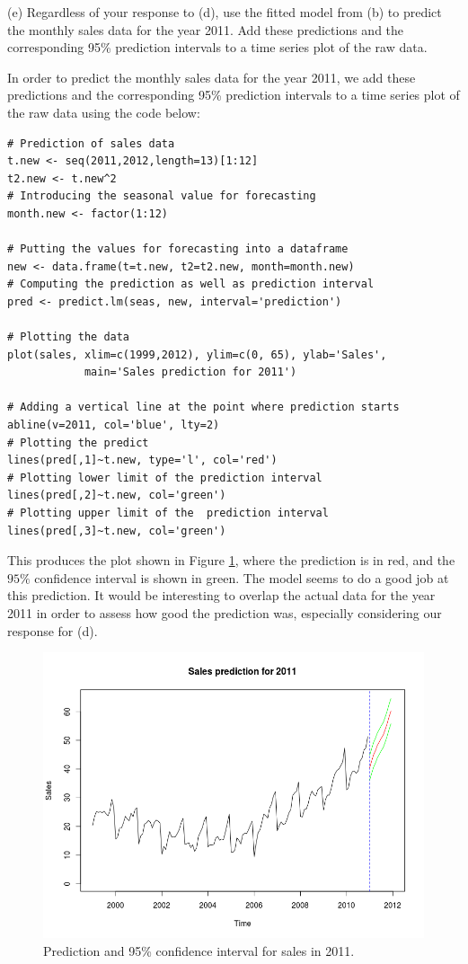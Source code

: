 \documentclass[]{article}
\begin{document}
(e) Regardless of your response to (d), use the fitted model from (b) to predict the monthly sales data for the year 2011. Add these predictions and the corresponding 95\% prediction intervals to a time series plot of the raw data.

\color{blue}
In order to predict the monthly sales data for the year 2011, we add these predictions and the corresponding 95\% prediction intervals to a time series plot of the raw data using the code below:

\begin{Verbatim}[frame=single]
# Prediction of sales data 
t.new <- seq(2011,2012,length=13)[1:12]
t2.new <- t.new^2
# Introducing the seasonal value for forecasting
month.new <- factor(1:12) 

# Putting the values for forecasting into a dataframe
new <- data.frame(t=t.new, t2=t2.new, month=month.new)
# Computing the prediction as well as prediction interval 
pred <- predict.lm(seas, new, interval='prediction') 

# Plotting the data
plot(sales, xlim=c(1999,2012), ylim=c(0, 65), ylab='Sales',
            main='Sales prediction for 2011')

# Adding a vertical line at the point where prediction starts
abline(v=2011, col='blue', lty=2) 
# Plotting the predict
lines(pred[,1]~t.new, type='l', col='red')
# Plotting lower limit of the prediction interval
lines(pred[,2]~t.new, col='green') 
# Plotting upper limit of the  prediction interval
lines(pred[,3]~t.new, col='green') 
\end{Verbatim}

This produces the plot shown in Figure \ref{pred2011}, where the prediction is in red, and the $95\%$ confidence interval is shown in green. The model seems to do a good job at this prediction. It would be interesting to overlap the actual data for the year 2011 in order to assess how good the prediction was, especially considering our response for (d).

\begin{figure}[!ht]
\centering
\includegraphics[width=\textwidth]{pred2011.png}
\caption{Prediction and 95\% confidence interval for sales in 2011.}
\label{pred2011}
\end{figure}

\color{black}
\end{document}
